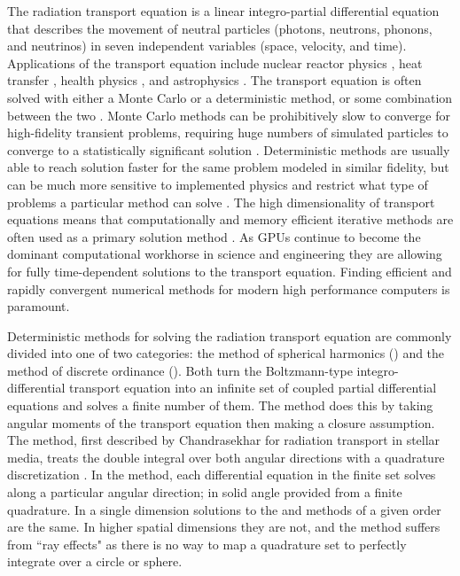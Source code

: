 The radiation transport equation is a linear integro-partial differential equation that describes the movement of neutral particles (photons, neutrons, phonons, and neutrinos) in seven independent variables (space, velocity, and time).
Applications of the transport equation include nuclear reactor physics \cite{duderstadt_hamilton}, heat transfer \cite{radheattrans2003}, health physics \cite{martelli_2010_light}, and astrophysics \cite{chandrasekhar1960radiative}.
The transport equation is often solved with either a Monte Carlo or a deterministic method, or some combination between the two \cite{lewis_computational_1984}.
Monte Carlo methods can be prohibitively slow to converge for high-fidelity transient problems, requiring huge numbers of simulated particles to converge to a statistically significant solution \cite{lux_1998}.
Deterministic methods are usually able to reach solution faster for the same problem modeled in similar fidelity, but can be much more sensitive to implemented physics and restrict what type of problems a particular method can solve \cite{lewis_computational_1984}. 
The high dimensionality of transport equations means that computationally and memory efficient iterative methods are often used as a primary solution method \cite{adams_fast_2002}.
As GPUs continue to become the dominant computational workhorse in science and engineering they are allowing for fully time-dependent solutions to the transport equation.
Finding efficient and rapidly convergent numerical methods for modern high performance computers is paramount.

Deterministic methods for solving the radiation transport equation are commonly divided into one of two categories: the method of spherical harmonics (\pn) and the method of discrete ordinance (\sn).
Both turn the Boltzmann-type integro-differential transport equation into an infinite set of coupled partial differential equations and solves a finite number of them.
The \pn method does this by taking angular moments of the transport equation then making a closure assumption.
The \sn method, first described by Chandrasekhar for radiation transport in stellar media, treats the double integral over both angular directions with a quadrature discretization \cite{chandrasekhar1960radiative}.
In the \sn method, each differential equation in the finite set solves along a particular angular direction; in solid angle provided from a finite quadrature.
In a single dimension solutions to the \sn and \pn methods of a given order are the same.
In higher spatial dimensions they are not, and the \sn method suffers from ``ray effects" as there is no way to map a quadrature set to perfectly integrate over a circle or sphere. %


